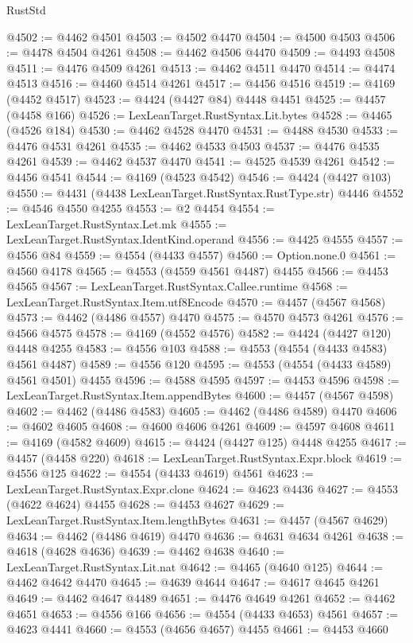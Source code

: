 \begin{lexlean}{RustStd}
\begin{coremodule}
@4502 := @4462 @4501
@4503 := @4502 @4470
@4504 := @4500 @4503
@4506 := @4478 @4504 @4261
@4508 := @4462 @4506 @4470
@4509 := @4493 @4508
@4511 := @4476 @4509 @4261
@4513 := @4462 @4511 @4470
@4514 := @4474 @4513
@4516 := @4460 @4514 @4261
@4517 := @4456 @4516
@4519 := @4169 (@4452 @4517)
@4523 := @4424 (@4427 @84) @4448 @4451
@4525 := @4457 (@4458 @166)
@4526 := LexLeanTarget.RustSyntax.Lit.bytes
@4528 := @4465 (@4526 @184)
@4530 := @4462 @4528 @4470
@4531 := @4488 @4530
@4533 := @4476 @4531 @4261
@4535 := @4462 @4533 @4503
@4537 := @4476 @4535 @4261
@4539 := @4462 @4537 @4470
@4541 := @4525 @4539 @4261
@4542 := @4456 @4541
@4544 := @4169 (@4523 @4542)
@4546 := @4424 (@4427 @103)
@4550 := @4431 (@4438 LexLeanTarget.RustSyntax.RustType.str) @4446
@4552 := @4546 @4550 @4255
@4553 := @2 @4454
@4554 := LexLeanTarget.RustSyntax.Let.mk
@4555 := LexLeanTarget.RustSyntax.IdentKind.operand
@4556 := @4425 @4555
@4557 := @4556 @84
@4559 := @4554 (@4433 @4557)
@4560 := Option.none.{0}
@4561 := @4560 @4178
@4565 := @4553 (@4559 @4561 @4487) @4455
@4566 := @4453 @4565
@4567 := LexLeanTarget.RustSyntax.Callee.runtime
@4568 := LexLeanTarget.RustSyntax.Item.utf8Encode
@4570 := @4457 (@4567 @4568)
@4573 := @4462 (@4486 @4557) @4470
@4575 := @4570 @4573 @4261
@4576 := @4566 @4575
@4578 := @4169 (@4552 @4576)
@4582 := @4424 (@4427 @120) @4448 @4255
@4583 := @4556 @103
@4588 := @4553 (@4554 (@4433 @4583) @4561 @4487)
@4589 := @4556 @120
@4595 := @4553 (@4554 (@4433 @4589) @4561 @4501) @4455
@4596 := @4588 @4595
@4597 := @4453 @4596
@4598 := LexLeanTarget.RustSyntax.Item.appendBytes
@4600 := @4457 (@4567 @4598)
@4602 := @4462 (@4486 @4583)
@4605 := @4462 (@4486 @4589) @4470
@4606 := @4602 @4605
@4608 := @4600 @4606 @4261
@4609 := @4597 @4608
@4611 := @4169 (@4582 @4609)
@4615 := @4424 (@4427 @125) @4448 @4255
@4617 := @4457 (@4458 @220)
@4618 := LexLeanTarget.RustSyntax.Expr.block
@4619 := @4556 @125
@4622 := @4554 (@4433 @4619) @4561
@4623 := LexLeanTarget.RustSyntax.Expr.clone
@4624 := @4623 @4436
@4627 := @4553 (@4622 @4624) @4455
@4628 := @4453 @4627
@4629 := LexLeanTarget.RustSyntax.Item.lengthBytes
@4631 := @4457 (@4567 @4629)
@4634 := @4462 (@4486 @4619) @4470
@4636 := @4631 @4634 @4261
@4638 := @4618 (@4628 @4636)
@4639 := @4462 @4638
@4640 := LexLeanTarget.RustSyntax.Lit.nat
@4642 := @4465 (@4640 @125)
@4644 := @4462 @4642 @4470
@4645 := @4639 @4644
@4647 := @4617 @4645 @4261
@4649 := @4462 @4647 @4489
@4651 := @4476 @4649 @4261
@4652 := @4462 @4651
@4653 := @4556 @166
@4656 := @4554 (@4433 @4653) @4561
@4657 := @4623 @4441
@4660 := @4553 (@4656 @4657) @4455
@4661 := @4453 @4660

\end{coremodule}
\end{lexlean}
